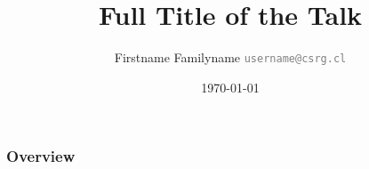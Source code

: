\documentclass{beamer}
\title[Short title]{Full Title of the Talk}
\author{Firstname Familyname
        \small{\textcolor{gray}{\texttt{username@csrg.cl}}}}
\institute[CSRG-UTFSM]{
Computer Systems Research Group,\\
Universidad Técnica Fedrico Santa María
}
\date{\today}
\begin{document}
\begin{frame}[t,plain]
\titlepage
\end{frame}



\begin{frame}
	\frametitle{Overview}
	\tableofcontents
\end{frame}





\begin{frame}[t,plain]
\titlepage
\end{frame}
\end{document}

